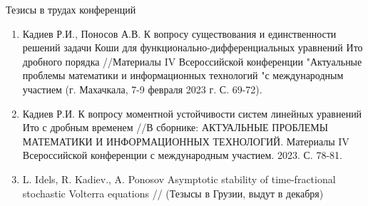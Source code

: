 Тезисы в трудах конференций

\begin{enumerate}
    \item Кадиев Р.И., Поносов А.В. К вопросу существования и
    единственности решений задачи Коши для
    функционально-дифференциальных уравнений Ито дробного порядка
    //Материалы IV Всероссийской конференции "Актуальные проблемы
    математики и информационных технологий "с международным участием (г.
    Махачкала, 7-9 февраля 2023 г. С. 69-72).
    
    \item Кадиев Р.И. К вопросу моментной устойчивости систем линейных
    уравнений Ито с  дробным временем //В сборнике: АКТУАЛЬНЫЕ ПРОБЛЕМЫ
    МАТЕМАТИКИ И ИНФОРМАЦИОННЫХ ТЕХНОЛОГИЙ. Материалы IV Всероссийской
    конференции с международным участием. 2023. С. 78-81.
    
    \item  L. Idels, R. Kadiev., A. Ponosov Asymptotic stability of
    time-fractional stochastic Volterra equations // (Тезысы в Грузии,
    выдут в декабря)
\end{enumerate}
